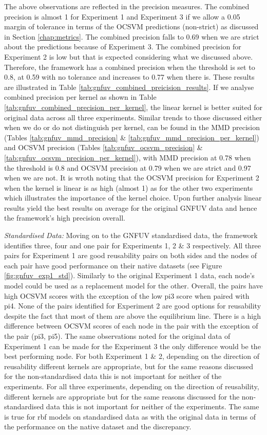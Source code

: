 \documentclass{mpaper}
\begin{document}
The above observations are reflected in the precision measures. The combined precision is almost 1 for Experiment 1 and Experiment 3 if we allow a 0.05 margin of tolerance in terms of the OCSVM predictions (non-strict) as discussed in Section \ref{chap:metrics}. The combined precision falls to 0.69 when we are strict about the predictions because of Experiment 3. The combined precision for Experiment 2 is low but that is expected considering what we discussed above. Therefore, the framework has a combined precision when the threshold is set to 0.8, at 0.59 with no tolerance and increases to 0.77 when there is. These results are illustrated in Table \ref{tab:gnfuv_combined_preicision_results}. If we analyse combined precision per kernel as shown in Table \ref{tab:gnfuv_combined_precision_per_kernel}, the linear kernel is better suited for original data across all three experiments. Similar trends to those discussed either when we do or do not distinguish per kernel, can be found in the MMD precision (Tables \ref{tab:gnfuv_mmd_precision} \& \ref{tab:gnfuv_mmd_precision_per_kernel}) and OCSVM precision (Tables \ref{tab:gnfuv_ocsvm_precision} \& \ref{tab:gnfuv_ocsvm_precision_per_kernel}), with MMD precision at 0.78 when the threshold is 0.8 and OCSVM precision at 0.79 when we are strict and 0.97 when we are not. It is wroth noting that the OCSVM precision for Experiment 2 when the kernel is linear is as high (almost 1) as for the other two experiments which illustrates the importance of the kernel choice. Upon further analysis linear results yield the best results on average for the original GNFUV data and hence the framework's high precision overall.

\textit{Standardised Data:} {} Moving on to the GNFUV standardised data, the framework identifies three, four and one pair for Experiments 1, 2 \& 3 respectively. All three pairs for Experiment 1 are good reusability pairs on both sides and the nodes of each pair have good performance on their native datasets (see Figure \ref{fig:gnfuv_exp1_std}). Similarly to the original Experiment 1 data, each node's model could be used as a replacement model for the other. Overall, the pairs have high OCSVM scores with the exception of the low pi3 score when paired with pi4. None of the pairs identified for Experiment 2 are good options for reusability despite the fact that most of them are above the equilibrium line. There is a high difference between OCSVM scores of each node in the pair with the exception of the pair (pi3, pi5). The same observations noted for the original data of Experiment 1 can be made for the Experiment 3 the only difference would be the best performing node. For both Experiment 1 \& 2, depending on the direction of reusability different kernels are appropriate, but for the same reasons discussed for the non-standardised data this is not important for neither of the experiments. For all three experiments, depending on the direction of reusability, different kernels are appropriate but for the same reasons discussed for the non-standardised data this is not important for neither of the experiments. The same is true for rbf models on standardised data as with the original data in terms of the performance on the native dataset and the discrepancy.
\end{document}
